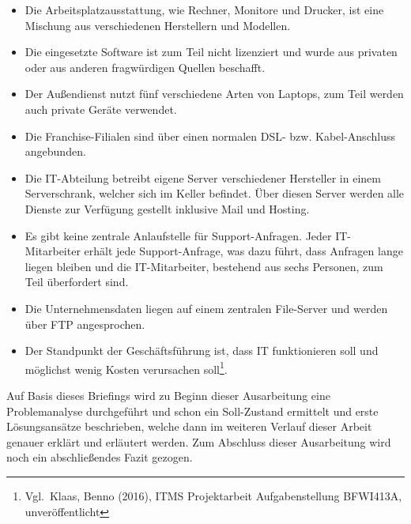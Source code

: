 \begin{itemize}
\item Die Arbeitsplatzausstattung, wie Rechner, Monitore und Drucker,
  ist eine Mischung aus verschiedenen Herstellern und Modellen.
\item Die eingesetzte Software ist zum Teil nicht lizenziert und wurde
  aus privaten oder aus anderen fragwürdigen Quellen beschafft.
\item Der Außendienst nutzt fünf verschiedene Arten von Laptops, zum
  Teil werden auch private Geräte verwendet.
\item Die Franchise-Filialen sind über einen normalen DSL-
  bzw. Kabel-Anschluss angebunden.
\item Die IT-Abteilung betreibt eigene Server verschiedener Hersteller
  in einem Serverschrank, welcher sich im Keller befindet. Über diesen
  Server werden alle Dienste zur Verfügung gestellt inklusive Mail und
  Hosting.
\item Es gibt keine zentrale Anlaufstelle für Support-Anfragen. Jeder
  IT-Mitarbeiter erhält jede Support-Anfrage, was dazu führt, dass
  Anfragen lange liegen bleiben und die IT-Mitarbeiter, bestehend aus
  sechs Personen, zum Teil überfordert sind.
\item Die Unternehmensdaten liegen auf einem zentralen File-Server und
werden über FTP angesprochen.
\item Der Standpunkt der Geschäftsführung ist, dass IT funktionieren
  soll und möglichst wenig Kosten verursachen
  soll\footnote{Vgl.~Klaas, Benno (2016), ITMS Projektarbeit
    Aufgabenstellung BFWI413A, unveröffentlicht}.
\end{itemize}

Auf Basis dieses Briefings wird zu Beginn dieser Ausarbeitung eine
Problemanalyse durchgeführt und schon ein Soll-Zustand ermittelt und
erste Lösungsansätze beschrieben, welche dann im weiteren Verlauf
dieser Arbeit genauer erklärt und erläutert werden. Zum Abschluss
dieser Ausarbeitung wird noch ein abschließendes Fazit gezogen.
